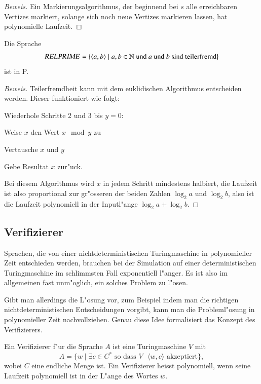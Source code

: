 \begin{proof}[Beweis]
Ein Markierungsalgorithmus, der beginnend bei $s$ alle erreichbaren
Vertizes markiert, solange sich noch neue Vertizes markieren lassen,
hat polynomielle Laufzeit.
\end{proof}

\begin{satz}
Die Sprache
\[
\text{\textsl{RELPRIME}}
=\{
\langle a,b\rangle \;|\;
\text{$a, b\in \mathbb N$ und $a$ und $b$ sind teilerfremd}
\}
\]
ist in P.
\end{satz}

\begin{proof}[Beweis]
Teilerfremdheit kann mit dem euklidischen Algorithmus entscheiden werden.
Dieser funktioniert wie folgt:
\begin{compactenum}
\item Wiederhole Schritte 2 und 3 bis $y=0$:
\item Weise $x$ den Wert $x\mod y$ zu
\item Vertausche $x$ und $y$
\item Gebe Resultat $x$ zur"uck.
\end{compactenum}
Bei diesem Algorithmus wird $x$ in jedem Schritt mindestens halbiert,
die Laufzeit ist also proportional zur gr"osseren der
beiden Zahlen $\log_2 a$ und $\log_2 b$, also ist die Laufzeit
polynomiell in der Inputl"ange $\log_2 a+\log_2 b$.
\end{proof}

\subsection{Verifizierer}
Sprachen, die von einer nichtdeterministischen Turingmaschine
in polynomieller Zeit entschieden werden, brauchen bei der
Simulation auf einer deterministischen Turingmaschine im
schlimmsten Fall exponentiell l"anger. Es ist also im
allgemeinen fast unm"oglich, ein solches Problem zu l"osen.

Gibt man allerdings die L"osung vor, zum Beispiel indem man
die richtigen nichtdeterministischen Entscheidungen vorgibt,
kann man die Probleml"osung in polynomieller Zeit nachvollziehen.
Genau diese Idee formalisiert das Konzept des Verifizierers.

\begin{definition}
Ein Verifizierer f"ur die Sprache $A$ ist eine Turingmaschine
$V$ mit
\[
A=\{
w\;|\;\text{$\exists c\in C^*$ so dass $V$ $\langle w,c\rangle$ akzeptiert}
\},
\]
wobei $C$ eine endliche Menge ist.
Ein Verifizierer heisst polynomiell, wenn seine Laufzeit polynomiell
ist in der L"ange des Wortes $w$.
\end{definition}


